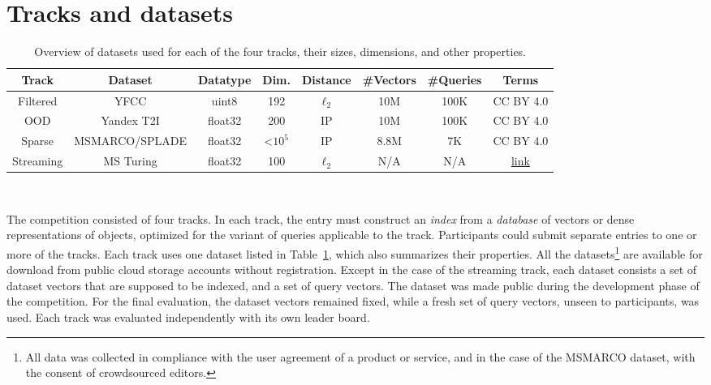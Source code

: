 \section{Tracks and datasets}
\label{sec:tracks}
\begin{table}[t]
    \footnotesize
    \begin{tabular*}{\textwidth}{c|ccccccc}
        \toprule
        Track    &  Dataset  &  Datatype  & Dim. & Distance & \#Vectors  & \#Queries & Terms \\
        \midrule
        {Filtered}  & YFCC    &  uint8     &    192      &    $\ell_2$   &    10M   &   100K     &  CC BY 4.0  \\
        {OOD}       & Yandex T2I &  float32  &    200      &    IP   &    10M    &   100K     & CC BY 4.0 \\
         {Sparse}   & MSMARCO/SPLADE    &  float32     &  <$10^5$  &     IP     &   8.8M  &    7K   &   CC BY 4.0      \\
        {Streaming} & MS Turing &  float32    &    100      &    $\ell_2$   &    N/A   &   N/A     &  \href{https://big-ann-benchmarks.com/MSFT-Turing-ANNS-terms.txt}{link}  \\ 
        \bottomrule
    \end{tabular*}
~~
    \caption{Overview of datasets used for each of the four tracks, their sizes, dimensions, and other properties.}
    \label{tab:data_details}
    \vspace{-15pt}
\end{table}

The competition consisted of four tracks.
%
In each track, the entry must construct an \emph{index} from a \emph{database} of vectors or dense representations
of objects, optimized for the variant of queries applicable to the track.
%
Participants could submit separate entries to one or more of the tracks.
%
Each track uses one dataset listed in Table~\ref{tab:data_details}, which also summarizes their properties. 
%
All the datasets\footnote{All data was collected in compliance with the user agreement of a product or service,
and in the case of the MSMARCO dataset, with the consent of crowdsourced editors.} are available for
download from public cloud storage accounts without registration.
%
Except in the case of the streaming track, each dataset consists  a set of dataset vectors that
are supposed to be indexed, and a set of query vectors.
%
The dataset was made public during the development phase of the competition. 
%
For the final evaluation, the dataset vectors remained fixed, while a fresh set of query vectors, unseen to participants, was used.
%
Each track was evaluated independently with its own leader board.


